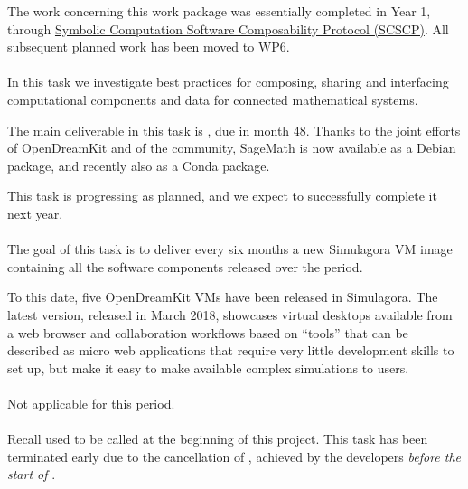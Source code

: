   The work concerning this work package was essentially completed in
  Year 1, through
  \href{http://www.symbolic-computing.org/science/index.php/SCSCP}{Symbolic
    Computation Software Composability Protocol (SCSCP)}. All
  subsequent planned work has been moved to WP6.

  
  \paragraph{}
  \label{component-architecture@mod-packaging}
  In this task we investigate best practices for composing, sharing
  and interfacing computational components and data for connected
  mathematical systems.

  The main deliverable in this task is
  , due in month
  48. Thanks to the joint efforts of OpenDreamKit and of the
  community, SageMath is now available as a Debian package, and
  recently also as a Conda package.

  This task is progressing as planned, and we expect to successfully
  complete it next year.

  \paragraph{}
  The goal of this task is to deliver every six months a new Simulagora
  VM image containing all the software components released over the
  period.

  To this date, five OpenDreamKit VMs have been released in
  Simulagora. The latest version, released in March 2018,
  showcases virtual desktops available from a web browser and
  collaboration workflows based on ``tools'' that can be described as
  micro web applications that require very little development skills
  to set up, but make it easy to make available complex simulations to
  users.
  
  \paragraph{}
  Not applicable for this period.

  \paragraph{}
  \label{component-architecture@extract-smc}
  Recall \cocalc used to be called \SMC at the beginning of this project.
  This task has been terminated early due to the cancellation of
  , achieved by the
  \cocalc developers \emph{before the start of \ODK}.

